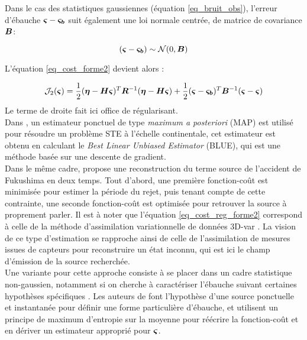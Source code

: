  Dans le cas des statistiques gaussiennes (équation \eqref{eq_bruit_obs}), l'erreur d'ébauche ${\bm{\varsigma}} - {\bm{\varsigma_b}}$ suit également une loi normale centrée, de matrice de covariance ${\bm{B}}$:
 
 \begin{equation}
 ({\bm{\varsigma}} - {\bm{\varsigma_b}}) \sim \mathcal{N}(0,{\bm{B}})
 \label{eq_erreur_ebauche}
 \end{equation}
 
 L'équation \eqref{eq_cost_forme2} devient alors \cite{Winiarek2011}:

\begin{equation}
\mathcal{J}_2({\bm{\varsigma}}) = \dfrac{1}{2}({\bm{\eta}} - {\bm{H}} {\bm{\varsigma}})^T {\bm{R}}^{-1}({\bm{\eta}} - {\bm{H}}{\bm{\varsigma}}) + \dfrac{1}{2}({\bm{\varsigma}} - {\bm{\varsigma_b}})^T{\bm{B}}^{-1}({\bm{\varsigma}} - {\bm{\varsigma}})
\label{eq_cost_reg_forme2}
\end{equation}
Le terme de droite fait ici office de régularisant. \\

Dans \cite{Winiarek2012}, un estimateur ponctuel de type \textit{maximum a posteriori} (MAP) est utilisé pour résoudre un problème STE à l'échelle continentale, cet estimateur est obtenu en calculant le \textit{Best Linear Unbiased Estimator} (BLUE), qui est une méthode basée sur une descente de gradient. \\

Dans le même cadre, \cite{Saunier2013} propose une reconstruction du terme source de l'accident de Fukushima en deux temps. Tout d'abord, une première fonction-coût est minimisée pour estimer la période du rejet, puis tenant compte de cette contrainte, une seconde fonction-coût est optimisée pour retrouver la source à proprement parler. 
Il est à noter que l'équation \eqref{eq_cost_reg_forme2} correspond à celle de la méthode d'assimilation variationnelle de données 3D-var \cite{Courtier1998}. La vision de ce type d'estimation se rapproche ainsi de celle de l'assimilation de mesures issues de capteurs pour reconstruire un état inconnu, qui est ici le champ d'émission de la source recherchée.\\

Une variante pour cette approche consiste à se placer dans un cadre statistique non-gaussien, notamment si on cherche à caractériser l'ébauche suivant certaines hypothèses spécifiques \cite{Bocquet2005a}. Les auteurs de \cite{Krysta2007} font l'hypothèse d'une source ponctuelle et instantanée pour définir une forme particulière d'ébauche, et utilisent un principe de maximum d'entropie sur la moyenne \cite{Jaynes1957} pour réécrire la fonction-coût et en dériver un estimateur approprié pour ${\bm{\varsigma}}$.\\

